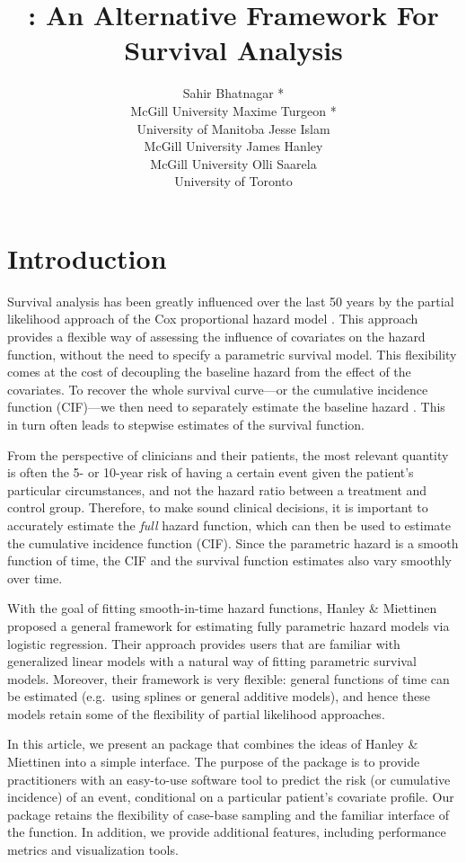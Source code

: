 \documentclass[
]{jss}
\author{
Sahir Bhatnagar *\\McGill University \And Maxime Turgeon *\\University
of Manitoba \AND Jesse Islam\\McGill University \And James
Hanley\\McGill University \And Olli Saarela\\University of Toronto
}
\title{\pkg{casebase}: An Alternative Framework For Survival Analysis}
\begin{document}
\hypertarget{introduction}{%
\section{Introduction}\label{introduction}}

Survival analysis has been greatly influenced over the last 50 years by
the partial likelihood approach of the Cox proportional hazard model
\citep{cox1972regression}. This approach provides a flexible way of
assessing the influence of covariates on the hazard function, without
the need to specify a parametric survival model. This flexibility comes
at the cost of decoupling the baseline hazard from the effect of the
covariates. To recover the whole survival curve---or the cumulative
incidence function (CIF)---we then need to separately estimate the
baseline hazard \citep{breslow1972discussion}. This in turn often leads
to stepwise estimates of the survival function.

From the perspective of clinicians and their patients, the most relevant
quantity is often the 5- or 10-year risk of having a certain event given
the patient's particular circumstances, and not the hazard ratio between
a treatment and control group. Therefore, to make sound clinical
decisions, it is important to accurately estimate the \emph{full} hazard
function, which can then be used to estimate the cumulative incidence
function (CIF). Since the parametric hazard is a smooth function of
time, the CIF and the survival function estimates also vary smoothly
over time.

With the goal of fitting smooth-in-time hazard functions, Hanley \&
Miettinen \citeyearpar{hanley2009fitting} proposed a general framework
for estimating fully parametric hazard models via logistic regression.
Their approach provides users that are familiar with generalized linear
models with a natural way of fitting parametric survival models.
Moreover, their framework is very flexible: general functions of time
can be estimated (e.g.~using splines or general additive models), and
hence these models retain some of the flexibility of partial likelihood
approaches.

In this article, we present an  package that combines the
ideas of Hanley \& Miettinen into a simple interface. The purpose of the
 package is to provide practitioners with an easy-to-use
software tool to predict the risk (or cumulative incidence) of an event,
conditional on a particular patient's covariate profile. Our package
retains the flexibility of case-base sampling and the familiar interface
of the  function. In addition, we provide additional features,
including performance metrics and visualization tools.
\end{document}
